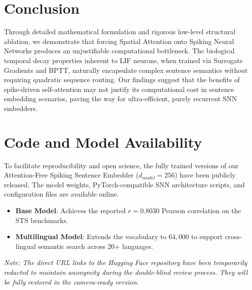 \documentclass[10pt]{article} %
\begin{document}
\section{Conclusion}
Through detailed mathematical formulation and rigorous low-level structural ablation, we demonstrate that forcing Spatial Attention onto Spiking Neural Networks produces an unjustifiable computational bottleneck. The biological temporal decay properties inherent to LIF neurons, when trained via Surrogate Gradients and BPTT, naturally encapsulate complex sentence semantics without requiring quadratic sequence routing. Our findings suggest that the benefits of spike-driven self-attention may not justify its computational cost in sentence embedding scenarios, paving the way for ultra-efficient, purely recurrent SNN embedders.


\section{Code and Model Availability}
To facilitate reproducibility and open science, the fully trained versions of our Attention-Free Spiking Sentence Embedder ($d_{model} = 256$) have been publicly released. The model weights, PyTorch-compatible SNN architecture scripts, and configuration files are available online.
\begin{itemize}
    \item \textbf{Base Model}: Achieves the reported $r = 0.8030$ Pearson correlation on the STS benchmarks.
    \item \textbf{Multilingual Model}: Extends the vocabulary to $64,000$ to support cross-lingual semantic search across 20+ languages.
\end{itemize}
\textit{Note: The direct URL links to the Hugging Face repository have been temporarily redacted to maintain anonymity during the double-blind review process. They will be fully restored in the camera-ready version.}




\end{document}
